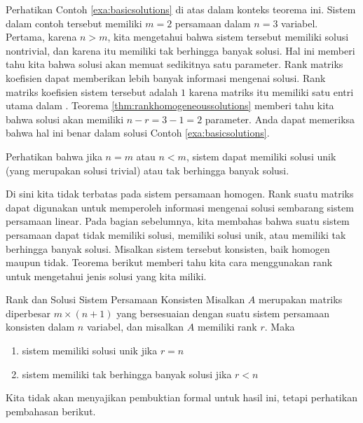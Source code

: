 Perhatikan Contoh \ref{exa:basicsolutions} di atas dalam konteks
teorema ini. Sistem dalam contoh tersebut memiliki $m = 2$ persamaan dalam $n =
3$ variabel. Pertama, karena $n>m$, kita mengetahui bahwa sistem tersebut memiliki
solusi nontrivial, dan karena itu memiliki tak berhingga banyak solusi. Hal ini
memberi tahu kita bahwa solusi akan memuat sedikitnya satu parameter. Rank
matriks koefisien dapat memberikan lebih banyak informasi mengenai
solusi. Rank matriks koefisien sistem tersebut adalah $1$ karena
matriks itu memiliki satu entri utama dalam \ef. Teorema \ref{thm:rankhomogeneoussolutions} memberi tahu kita bahwa
solusi akan memiliki $n-r = 3-1 = 2$ parameter. Anda dapat memeriksa bahwa hal ini
benar dalam solusi Contoh \ref{exa:basicsolutions}.

Perhatikan bahwa jika $n=m$ atau $n<m$, sistem dapat memiliki solusi unik (yang merupakan solusi trivial) atau tak berhingga banyak solusi.

Di sini kita tidak terbatas pada sistem persamaan homogen. Rank suatu matriks dapat digunakan untuk memperoleh informasi mengenai
solusi sembarang sistem persamaan linear.
Pada bagian sebelumnya, kita membahas bahwa suatu sistem persamaan dapat tidak memiliki solusi, memiliki solusi unik, atau memiliki tak berhingga banyak solusi.
Misalkan sistem tersebut konsisten, baik homogen maupun tidak. Teorema berikut memberi tahu kita
cara menggunakan rank untuk mengetahui jenis solusi yang kita miliki.

\begin{theorem}{Rank dan Solusi Sistem Persamaan Konsisten}\label{thm:rankconsistentsolutions}
Misalkan $A$ merupakan matriks diperbesar $m \times \left( n+1 \right) $ yang bersesuaian dengan suatu sistem persamaan konsisten dalam $n$ variabel, dan misalkan $A$ memiliki rank $r$.
Maka
\begin{enumerate}
\item sistem memiliki solusi unik jika $r = n $
\item sistem memiliki tak berhingga banyak solusi jika $r < n$
\end{enumerate}
\end{theorem}

Kita tidak akan menyajikan pembuktian formal untuk hasil ini, tetapi perhatikan pembahasan berikut.


